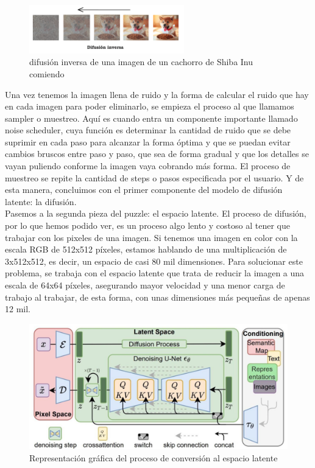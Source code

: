 \begin{figure}[h]
	\centering
	\includegraphics[width = 0.6\textwidth]{Imagenes/Vectorial/difusioninversa.png}
	\caption{difusión inversa de una imagen de un cachorro de Shiba Inu comiendo}
	\label{fig:difusioninversa}
\end{figure}

Una vez tenemos la imagen llena de ruido y la forma de calcular el ruido que hay en cada imagen para poder eliminarlo, se empieza el proceso al que llamamos sampler o muestreo. Aquí es cuando entra un componente importante llamado noise scheduler, cuya función es determinar la cantidad de ruido que se debe suprimir en cada paso para alcanzar la forma óptima y que se puedan evitar cambios bruscos entre paso y paso, que sea de forma gradual y que los detalles se vayan puliendo conforme la imagen vaya cobrando más forma. El proceso de muestreo se repite la cantidad de steps o pasos especificada por el usuario. Y de esta manera, concluimos con el primer componente del modelo de difusión latente: la difusión.\\ 

Pasemos a la segunda pieza del puzzle: el espacio latente. El proceso de difusión, por lo que hemos podido ver, es un proceso algo lento y costoso al tener que trabajar con los pixeles de una imagen. Si tenemos una imagen en color con la escala RGB de 512x512 píxeles, estamos hablando de una multiplicación de 3x512x512, es decir, un espacio de casi 80 mil dimensiones. Para solucionar este problema, se trabaja con el espacio latente que trata de reducir la imagen a una escala de 64x64 píxeles, asegurando mayor velocidad y una menor carga de trabajo al trabajar, de esta forma, con unas dimensiones más pequeñas de apenas 12 mil. 

\begin{figure}[h]
	\centering
	\includegraphics[width = 0.5
	\textwidth]{Imagenes/Vectorial/espaciolatente.png}
	\caption{Representación gráfica del proceso de conversión al espacio latente}
	\label{fig:latentspace}
\end{figure}

